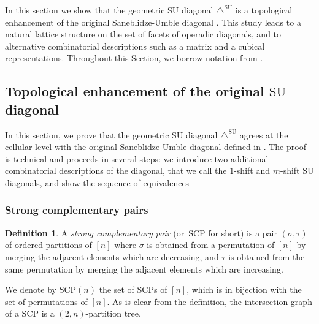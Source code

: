 \documentclass{amsart}
\newcommand{\darkblue}{\color{darkblue}} %
\theoremstyle{definition}
\newtheorem{definition}[theorem]{Definition}
\newcommand{\defn}[1]{\textsl{\darkblue #1}} %
\newcommand{\SU}{\mathrm{SU}}
\newcommand{\SUD}{\triangle^{\mathrm{SU}}}
\newcommand{\SCP}{\mathrm{SCP}}
\begin{document}
In this section we show that the geometric $\SU$ diagonal $\SUD$ is a topological enhancement of the original Saneblidze-Umble diagonal \cite{SaneblidzeUmble}.
This study leads to a natural lattice structure on the set of facets of operadic diagonals, and to alternative combinatorial descriptions such as a matrix and a cubical representations. 
Throughout this Section, we borrow notation from \cite{SaneblidzeUmble-comparingDiagonals}.


\subsection{Topological enhancement of the original $\SU$ diagonal}

In this section, we prove that the geometric $\SU$ diagonal $\SUD$ agrees at the cellular level with the original Saneblidze-Umble diagonal defined in \cite{SaneblidzeUmble}.
The proof is technical and proceeds in several steps: we introduce two additional combinatorial descriptions of the diagonal, that we call the $1$-shift and $m$-shift $\SU$ diagonals, and show the sequence of equivalences
\begin{center}
\end{center}


\subsubsection{Strong complementary pairs}

\begin{definition}
\label{def:strong-complementary-pairs}
A \defn{strong complementary pair} (or~\defn{$\SCP$} for short) is a pair $(\sigma,\tau)$ of ordered partitions of $[n]$ where $\sigma$ is obtained from a permutation of $[n]$ by merging the adjacent elements which are decreasing, and $\tau$ is obtained from the same permutation by merging the adjacent elements which are increasing.
\end{definition}

We denote by $\SCP(n)$ the set of $\SCP$s of $[n]$, which is in bijection with the set of permutations of $[n]$.
As is clear from the definition, the intersection graph of a $\SCP$ is a $(2,n)$-partition tree.
\end{document}
